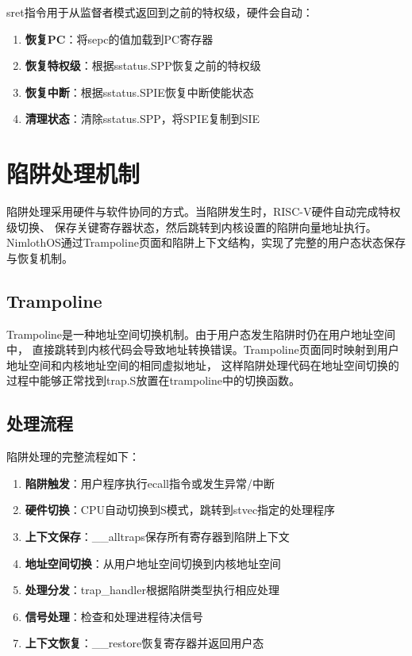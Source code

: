 sret指令用于从监督者模式返回到之前的特权级，硬件会自动：

\begin{enumerate}
    \item \textbf{恢复PC}：将sepc的值加载到PC寄存器
    \item \textbf{恢复特权级}：根据sstatus.SPP恢复之前的特权级
    \item \textbf{恢复中断}：根据sstatus.SPIE恢复中断使能状态
    \item \textbf{清理状态}：清除sstatus.SPP，将SPIE复制到SIE
\end{enumerate}

\section{陷阱处理机制}

陷阱处理采用硬件与软件协同的方式。当陷阱发生时，RISC-V硬件自动完成特权级切换、
保存关键寄存器状态，然后跳转到内核设置的陷阱向量地址执行。
NimlothOS通过Trampoline页面和陷阱上下文结构，实现了完整的用户态状态保存与恢复机制。

\subsection{Trampoline}

Trampoline是一种地址空间切换机制。由于用户态发生陷阱时仍在用户地址空间中，
直接跳转到内核代码会导致地址转换错误。Trampoline页面同时映射到用户地址空间和内核地址空间的相同虚拟地址，
这样陷阱处理代码在地址空间切换的过程中能够正常找到trap.S放置在trampoline中的切换函数。

\subsection{处理流程}

陷阱处理的完整流程如下：

\begin{enumerate}
    \item \textbf{陷阱触发}：用户程序执行ecall指令或发生异常/中断
    \item \textbf{硬件切换}：CPU自动切换到S模式，跳转到stvec指定的处理程序
    \item \textbf{上下文保存}：\_\_alltraps保存所有寄存器到陷阱上下文
    \item \textbf{地址空间切换}：从用户地址空间切换到内核地址空间
    \item \textbf{处理分发}：trap\_handler根据陷阱类型执行相应处理
    \item \textbf{信号处理}：检查和处理进程待决信号
    \item \textbf{上下文恢复}：\_\_restore恢复寄存器并返回用户态
\end{enumerate}

